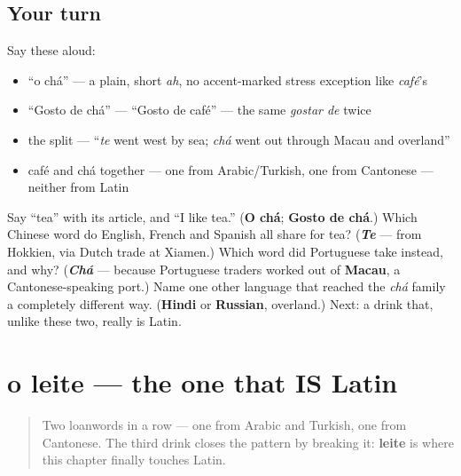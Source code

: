 \subsection*{Your turn}
Say these aloud:

\begin{itemize}
\raggedright
  \item \textquotedblleft{}o chá\textquotedblright{} — a plain, short \emph{ah}, no accent-marked stress exception like \emph{café}'s
  \item \textquotedblleft{}Gosto de chá\textquotedblright{} — \textquotedblleft{}Gosto de café\textquotedblright{} — the same \emph{gostar de} twice
  \item the split — \textquotedblleft{}\emph{te} went west by sea; \emph{chá} went out through Macau and overland\textquotedblright{}
  \item café and chá together — one from Arabic/Turkish, one from Cantonese — neither from Latin
\end{itemize}

\begin{tcolorbox}[breakable,colback=teal!4,colframe=teal!35!black,title={Before you move on}]
Say \textquotedblleft{}tea\textquotedblright{} with its article, and \textquotedblleft{}I like tea.\textquotedblright{} (\textbf{O chá}; \textbf{Gosto de chá}.) Which Chinese word do English, French and Spanish all share for tea? (\emph{\textbf{Te}} — from Hokkien, via Dutch trade at Xiamen.) Which word did Portuguese take instead, and why? (\emph{\textbf{Chá}} — because Portuguese traders worked out of \textbf{Macau}, a Cantonese-speaking port.) Name one other language that reached the \emph{chá} family a completely different way. (\textbf{Hindi} or \textbf{Russian}, overland.) Next: a drink that, unlike these two, really is Latin.
\end{tcolorbox}
\section[o leite]{o leite — the one that IS Latin}

\label{lesson:PT-C23-leite}



\begin{quote}
Two loanwords in a row — one from Arabic and Turkish, one from Cantonese. The third drink closes the pattern by breaking it: \textbf{leite} is where this chapter finally touches Latin.
\end{quote}

